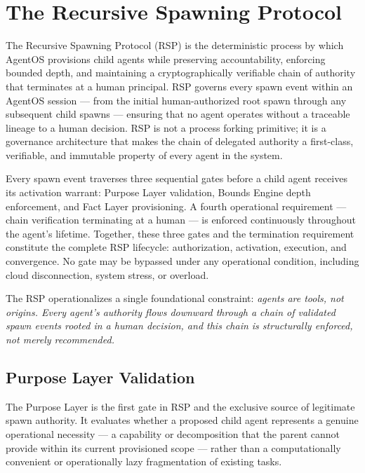 \section{The Recursive Spawning Protocol}

The Recursive Spawning Protocol (RSP) is the deterministic process by which AgentOS provisions child agents while preserving accountability, enforcing bounded depth, and maintaining a cryptographically verifiable chain of authority that terminates at a human principal. RSP governs every spawn event within an AgentOS session — from the initial human-authorized root spawn through any subsequent child spawns — ensuring that no agent operates without a traceable lineage to a human decision. RSP is not a process forking primitive; it is a governance architecture that makes the chain of delegated authority a first-class, verifiable, and immutable property of every agent in the system.

Every spawn event traverses three sequential gates before a child agent receives its activation warrant: Purpose Layer validation, Bounds Engine depth enforcement, and Fact Layer provisioning. A fourth operational requirement — chain verification terminating at a human — is enforced continuously throughout the agent's lifetime. Together, these three gates and the termination requirement constitute the complete RSP lifecycle: authorization, activation, execution, and convergence. No gate may be bypassed under any operational condition, including cloud disconnection, system stress, or overload.

The RSP operationalizes a single foundational constraint: \textit{agents are tools, not origins. Every agent's authority flows downward through a chain of validated spawn events rooted in a human decision, and this chain is structurally enforced, not merely recommended.}

\subsection{Purpose Layer Validation}

The Purpose Layer is the first gate in RSP and the exclusive source of legitimate spawn authority. It evaluates whether a proposed child agent represents a genuine operational necessity — a capability or decomposition that the parent cannot provide within its current provisioned scope — rather than a computationally convenient or operationally lazy fragmentation of existing tasks.

